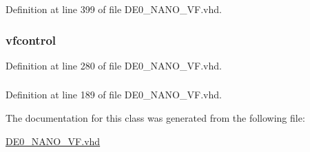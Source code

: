 Definition at line 399 of file D\+E0\+\_\+\+N\+A\+N\+O\+\_\+\+V\+F.\+vhd.

\hypertarget{class_d_e0___n_a_n_o___v_f_1_1_m_a_i_n_a05342d075a5ca740d21e6ef1a5509684}{}
\subsubsection[{uvf}]{ {\bfseries \textcolor{vhdlchar}{vfcontrol}\textcolor{vhdlchar}{ }} \hspace{0.3cm}{\ttfamily [Instantiation]}}\label{class_d_e0___n_a_n_o___v_f_1_1_m_a_i_n_a05342d075a5ca740d21e6ef1a5509684}


Definition at line 280 of file D\+E0\+\_\+\+N\+A\+N\+O\+\_\+\+V\+F.\+vhd.

\hypertarget{class_d_e0___n_a_n_o___v_f_1_1_m_a_i_n_a96f8f02a115cd76909b2395df08d3902}{}
\subsubsection[{vfcontrol}]{ {\bfseries \textcolor{vhdlchar}{ }} \hspace{0.3cm}{\ttfamily [Component]}}\label{class_d_e0___n_a_n_o___v_f_1_1_m_a_i_n_a96f8f02a115cd76909b2395df08d3902}


Definition at line 189 of file D\+E0\+\_\+\+N\+A\+N\+O\+\_\+\+V\+F.\+vhd.



The documentation for this class was generated from the following file\+:\begin{DoxyCompactItemize}
\item 
\hyperlink{_d_e0___n_a_n_o___v_f_8vhd}{D\+E0\+\_\+\+N\+A\+N\+O\+\_\+\+V\+F.\+vhd}\end{DoxyCompactItemize}
